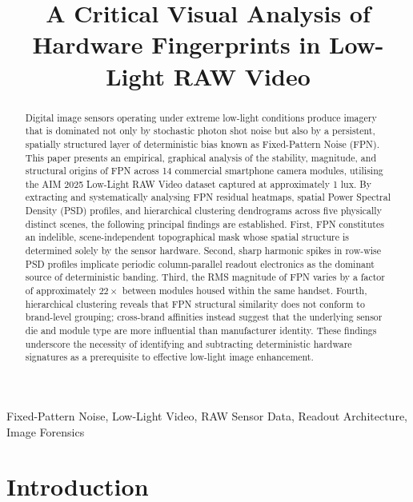 \documentclass[conference]{IEEEtran}
\begin{document}
\title{A Critical Visual Analysis of Hardware Fingerprints in Low-Light RAW Video}

\author{
}

\maketitle

\begin{abstract}
Digital image sensors operating under extreme low-light conditions produce imagery that is dominated not only by stochastic photon shot noise but also by a persistent, spatially structured layer of deterministic bias known as Fixed-Pattern Noise (FPN). This paper presents an empirical, graphical analysis of the stability, magnitude, and structural origins of FPN across 14 commercial smartphone camera modules, utilising the AIM 2025 Low-Light RAW Video dataset captured at approximately 1 lux. By extracting and systematically analysing FPN residual heatmaps, spatial Power Spectral Density (PSD) profiles, and hierarchical clustering dendrograms across five physically distinct scenes, the following principal findings are established. First, FPN constitutes an indelible, scene-independent topographical mask whose spatial structure is determined solely by the sensor hardware. Second, sharp harmonic spikes in row-wise PSD profiles implicate periodic column-parallel readout electronics as the dominant source of deterministic banding. Third, the RMS magnitude of FPN varies by a factor of approximately $22\times$ between modules housed within the same handset. Fourth, hierarchical clustering reveals that FPN structural similarity does not conform to brand-level grouping; cross-brand affinities instead suggest that the underlying sensor die and module type are more influential than manufacturer identity. These findings underscore the necessity of identifying and subtracting deterministic hardware signatures as a prerequisite to effective low-light image enhancement.
\end{abstract}

\begin{IEEEkeywords}
Fixed-Pattern Noise, Low-Light Video, RAW Sensor Data, Readout Architecture, Image Forensics
\end{IEEEkeywords}

\section{Introduction}
\end{document}
